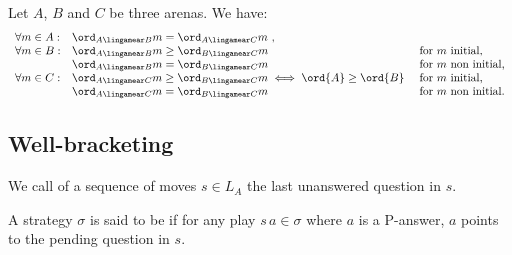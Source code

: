 \begin{lemma}
\label{lem:compositionorder} Let $A$, $B$ and $C$ be three arenas.
We have:
$$\begin{array}{lll}
\forall m \in A:
    &  \ord_{A\lingamear B}{m} = \ord_{A\lingamear C}{m} \ ,\\
\forall m \in B:
    & \ord_{A\lingamear B}{m} \geq \ord_{B\lingamear C}{m}  & \mbox{for $m$ initial,}\\
    & \ord_{A\lingamear B}{m} = \ord_{B\lingamear C}{m} & \mbox{for $m$ non initial,} \\
\forall m \in C:
    & \ord_{A\lingamear C}{m} \geq \ord_{B\lingamear C}{m} \iff
\ord{A} \geq \ord{B}\ & \mbox{for $m$ initial,}\\
    & \ord_{A\lingamear C}{m} = \ord_{B\lingamear C}{m}   & \mbox{for $m$ non initial.}
\end{array}
$$
\end{lemma}

\subsection{Well-bracketing}

We call  of a sequence of moves $s \in L_A$ the last unanswered question in $s$.

\begin{definition}\rm
A strategy $\sigma$ is said to be  if for any play $s \, a \in \sigma$ where $a$ is a  P-answer, $a$ points to the pending question in $s$.
\end{definition}



